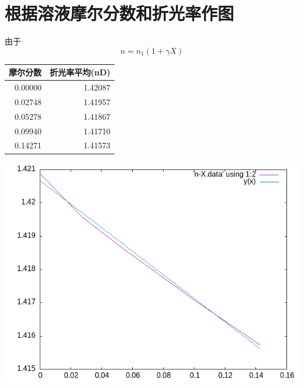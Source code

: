 \documentclass[11pt]{report}
\begin{document}
\section{根据溶液摩尔分数和折光率作图}
\label{sec:orgb39b221}
由于
\[
n=n_{1}(1+\gamma X)
\]
\begin{center}
\begin{tabular}{rr}
摩尔分数 & 折光率平均(nD)\\
\hline
0.00000 & 1.42087\\
0.02748 & 1.41957\\
0.05278 & 1.41867\\
0.09940 & 1.41710\\
0.14271 & 1.41573\\
\end{tabular}
\end{center}
\begin{center}
\includegraphics[width=.9\linewidth]{../data/n-X.png}
\end{center}
\end{document}

